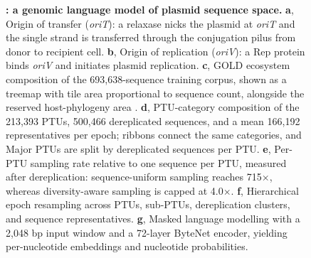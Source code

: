 %
%
%

%
\begin{figure}[h]
    \centering
\caption{
\textbf{\model: a genomic language model of plasmid sequence space.} \textbf{a}, Origin of transfer (\emph{oriT}): a relaxase nicks the plasmid at \emph{oriT} and the single strand is transferred through the conjugation pilus from donor to recipient cell. \textbf{b}, Origin of replication (\emph{oriV}): a Rep protein binds \emph{oriV} and initiates plasmid replication. \textbf{c}, GOLD ecosystem composition of the 693,638-sequence training corpus, shown as a treemap with tile area proportional to sequence count, alongside the reserved host-phylogeny area \cite{mukherjee2023twenty}. \textbf{d}, PTU-category composition of the 213,393 PTUs, 500,466 dereplicated sequences, and a mean 166,192 representatives per epoch; ribbons connect the same categories, and Major PTUs are split by dereplicated sequences per PTU. \textbf{e}, Per-PTU sampling rate relative to one sequence per PTU, measured after dereplication: sequence-uniform sampling reaches 715$\times$, whereas diversity-aware sampling is capped at 4.0$\times$. \textbf{f}, Hierarchical epoch resampling across PTUs, sub-PTUs, dereplication clusters, and sequence representatives. \textbf{g}, Masked language modelling with a 2,048 bp input window and a 72-layer ByteNet encoder, yielding per-nucleotide embeddings and nucleotide probabilities.
}
\label{fig:pretraining}
\end{figure}


